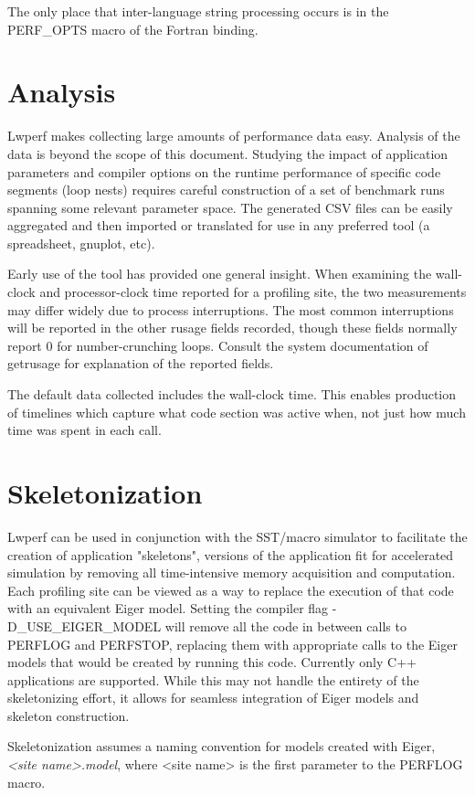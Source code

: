 \documentclass{article}
\begin{document}
The only place that inter-language string processing occurs is in the PERF\_OPTS macro of the Fortran binding.

\section{Analysis}
Lwperf makes collecting large amounts of performance data easy. Analysis of the data is beyond the scope of this document. Studying the impact of application parameters and compiler options on the runtime performance of specific code segments (loop nests) requires careful construction of a set of benchmark runs spanning some relevant parameter space. The generated CSV files can be easily aggregated and then imported or translated for use in any preferred tool (a spreadsheet, gnuplot, etc).

Early use of the tool has provided one general insight. When examining the wall-clock and processor-clock time reported for a profiling site, the two measurements may differ widely due to process interruptions. The most common interruptions will be reported in the other rusage fields recorded, though these fields normally report 0 for number-crunching loops. Consult the system documentation of getrusage for explanation of the reported fields.

The default data collected includes the wall-clock time. This enables production of timelines which capture what code section was active when, not just how much time was spent in each call.

\section{Skeletonization}
Lwperf can be used in conjunction with the SST/macro simulator to facilitate the creation of application "skeletons", versions of the application fit for accelerated simulation by removing all time-intensive memory acquisition and computation. Each profiling site can be viewed as a way to replace the execution of that code with an equivalent Eiger model. Setting the compiler flag -D\_USE\_EIGER\_MODEL will remove all the code in between calls to PERFLOG and PERFSTOP, replacing them with appropriate calls to the Eiger models that would be created by running this code. Currently only C++ applications are supported. While this may not handle the entirety of the skeletonizing effort, it allows for seamless integration of Eiger models and skeleton construction. 

Skeletonization assumes a naming convention for models created with Eiger, \textit{<site name>.model}, where <site name> is the first parameter to the PERFLOG macro.
\end{document}
